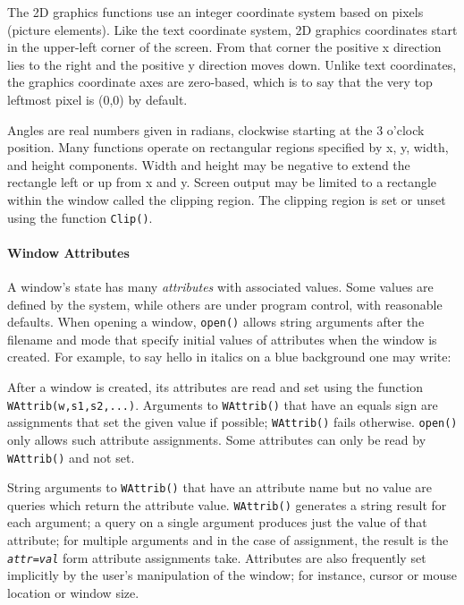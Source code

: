 The 2D graphics functions use an integer coordinate system based on
pixels (picture elements). Like the text coordinate system, 2D
graphics coordinates start in the upper-left corner of the screen.
From that corner the positive x direction lies to the right and the
positive y direction moves down. Unlike text coordinates, the graphics
coordinate axes are zero-based, which is to say that the very top
leftmost pixel is (0,0) by default.

Angles are real numbers given in radians, clockwise starting at the 3
o'clock position. Many functions operate on rectangular regions
specified by x, y, width, and height components.  Width and height may
be negative to extend the rectangle left or up from x and y. Screen
output may be limited to a rectangle within the window called the
clipping region. The clipping region is set or unset using the
function \texttt{Clip()}.

\paragraph{Window Attributes}
A window's state has many \textit{attributes} with associated
values. Some values are defined by the system, while others are under
program control, with reasonable defaults. When opening a window,
\texttt{open()} allows string arguments after the filename and mode
that specify initial values of attributes when the window is
created. For example, to say hello in italics on a blue background one
may write:


After a window is created, its attributes are read and set using the
function \texttt{WAttrib(w,s1,s2,...)}. Arguments to
\texttt{WAttrib()} that have an equals sign are assignments that set
the given value if possible; \texttt{WAttrib()} fails otherwise.
\texttt{open()} only allows such attribute assignments. Some
attributes can only be read by \texttt{WAttrib()} and not set.

String arguments to \texttt{WAttrib()} that have an attribute name but
no value are queries which return the attribute value.
\texttt{WAttrib()} generates a string result for each argument; a
query on a single argument produces just the value of that attribute;
for multiple arguments and in the case of assignment, the result is
the \texttt{\textit{attr}}\texttt{=}\texttt{\textit{val}} form
attribute assignments take. Attributes are also frequently set
implicitly by the user's manipulation of the window; for instance,
cursor or mouse location or window size.

